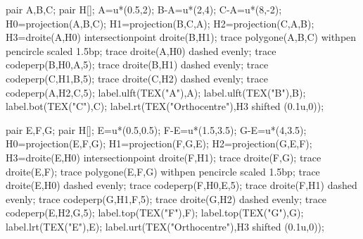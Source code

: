 \begin{changemargin}{0mm}{-15mm}
    \begin{Geometrie}[CoinHD={(10u,7u)},CoinBG={(0,-0.5u)}]
        pair A,B,C;
        pair H[];
        A=u*(0.5,2);
        B-A=u*(2,4);
        C-A=u*(8,-2);
        H0=projection(A,B,C);
        H1=projection(B,C,A);
        H2=projection(C,A,B);
        H3=droite(A,H0) intersectionpoint droite(B,H1);
        trace polygone(A,B,C) withpen pencircle scaled 1.5bp;
        trace droite(A,H0) dashed evenly;
        trace codeperp(B,H0,A,5);
        trace droite(B,H1) dashed evenly;
        trace codeperp(C,H1,B,5);
        trace droite(C,H2) dashed evenly;
        trace codeperp(A,H2,C,5);
        label.ulft(TEX("A"),A);
        label.ulft(TEX("B"),B);
        label.bot(TEX("C"),C);
        label.rt(TEX("Orthocentre"),H3 shifted (0.1u,0));
    \end{Geometrie}
    \hspace*{0.1\linewidth}
    \begin{Geometrie}[CoinHD={(5u,7u)}]
        pair E,F,G;
        pair H[];
        E=u*(0.5,0.5);
        F-E=u*(1.5,3.5);
        G-E=u*(4,3.5);
        H0=projection(E,F,G);
        H1=projection(F,G,E);
        H2=projection(G,E,F);
        H3=droite(E,H0) intersectionpoint droite(F,H1);
        trace droite(F,G);
        trace droite(E,F);
        trace  polygone(E,F,G) withpen pencircle scaled 1.5bp;
        trace droite(E,H0) dashed evenly;
        trace codeperp(F,H0,E,5);
        trace droite(F,H1) dashed evenly;
        trace codeperp(G,H1,F,5);
        trace droite(G,H2) dashed evenly;
        trace codeperp(E,H2,G,5);
        label.top(TEX("F"),F);
        label.top(TEX("G"),G);
        label.lrt(TEX("E"),E);
        label.urt(TEX("Orthocentre"),H3 shifted (0.1u,0));
    \end{Geometrie}
    
\end{changemargin}

